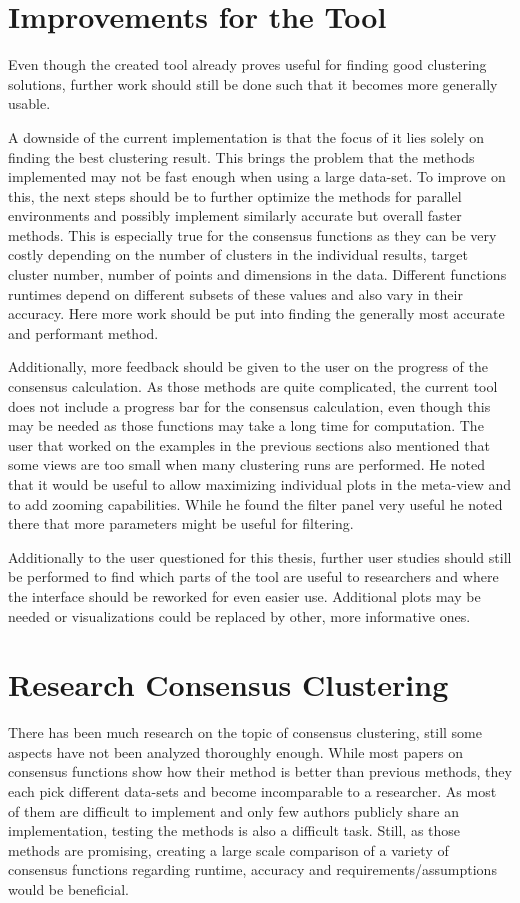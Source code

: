 \documentclass[
	a4paper,
	english,
	twoside,
	openright,               
	11pt                            
	]{report}
\begin{document}
\section{Improvements for the Tool}
Even though the created tool already proves useful for finding good clustering solutions, further work should still be done such that it becomes more generally usable. 

A downside of the current implementation is that the focus of it lies solely on finding the best clustering result. This brings the problem that the methods implemented may not be fast enough when using a large data-set. To improve on this, the next steps should be to further optimize the methods for parallel environments and possibly implement similarly accurate but overall faster methods. This is especially true for the consensus functions as they can be very costly depending on the number of clusters in the individual results, target cluster number, number of points and dimensions in the data. Different functions runtimes depend on different subsets of these values and also vary in their accuracy. Here more work should be put into finding the generally most accurate and performant method.

Additionally, more feedback should be given to the user on the progress of the consensus calculation. As those methods are quite complicated, the current tool does not include a progress bar for the consensus calculation, even though this may be needed as those functions may take a long time for computation. The user that worked on the examples in the previous sections also mentioned that some views are too small when many clustering runs are performed. He noted that it would be useful to allow maximizing individual plots in the meta-view and to add zooming capabilities. While he found the filter panel very useful he noted there that more parameters might be useful for filtering.

Additionally to the user questioned for this thesis, further user studies should still be performed to find which parts of the tool are useful to researchers and where the interface should be reworked for even easier use. Additional plots may be needed or visualizations could be replaced by other, more informative ones.

\section{Research Consensus Clustering}
There has been much research on the topic of consensus clustering, still some aspects have not been analyzed thoroughly enough. While most papers on consensus functions show how their method is better than previous methods, they each pick different data-sets and become incomparable to a researcher. As most of them are difficult to implement and only few authors publicly share an implementation, testing the methods is also a difficult task. Still, as those methods are promising, creating a large scale comparison of a variety of consensus functions regarding runtime, accuracy and requirements/assumptions would be beneficial.
\end{document}
